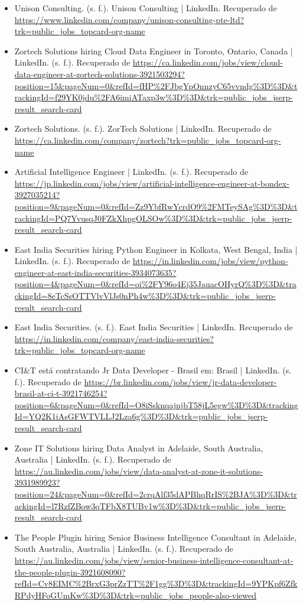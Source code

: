 \documentclass[12pt]{article}
\begin{document}
\begin{itemize}
            \item Unison Consulting. (s. f.). Unison Consulting | LinkedIn. Recuperado de {\url{https://www.linkedin.com/company/unison-consulting-pte-ltd?trk=public_jobs_topcard-org-name}}
            \item Zortech Solutions hiring Cloud Data Engineer in Toronto, Ontario, Canada | LinkedIn. (s. f.). Recuperado de {\url{https://ca.linkedin.com/jobs/view/cloud-data-engineer-at-zortech-solutions-3921503294?position=15&pageNum=0&refId=fHP%2FJbgYpOnnzyC65vvndg%3D%3D&trackingId=f29YK0jdu%2FA6imiATaxp3w%3D%3D&trk=public_jobs_jserp-result_search-card}}
            \item Zortech Solutions. (s. f.). ZorTech Solutions | LinkedIn. Recuperado de {\url{https://ca.linkedin.com/company/zortech?trk=public_jobs_topcard-org-name}}
            \item Artificial Intelligence Engineer | LinkedIn. (s. f.). Recuperado de {\url{https://jp.linkedin.com/jobs/view/artificial-intelligence-engineer-at-bondex-3927035214?position=9&pageNum=0&refId=Zz9YbfRwYcrdO9%2FMTeySAg%3D%3D&trackingId=PQ7YvusqJ0FZkXhpgOLSOw%3D%3D&trk=public_jobs_jserp-result_search-card}}
            \item East India Securities hiring Python Engineer in Kolkata, West Bengal, India | LinkedIn. (s. f.). Recuperado de {\url{https://in.linkedin.com/jobs/view/python-engineer-at-east-india-securities-3934073635?position=4&pageNum=0&refId=oi%2FY96o4Ej35JauacOHyrQ%3D%3D&trackingId=8eTcSsOTTVlvVlJs0nPh4w%3D%3D&trk=public_jobs_jserp-result_search-card}}
            \item East India Securities. (s. f.). East India Securities | LinkedIn. Recuperado de {\url{https://in.linkedin.com/company/east-india-securities?trk=public_jobs_topcard-org-name}}
            \item CI\&T está contratando Jr Data Developer - Brasil em: Brasil | LinkedIn. (s. f.). Recuperado de {\url{https://br.linkedin.com/jobs/view/jr-data-developer-brasil-at-ci-t-3921746254?position=6&pageNum=0&refId=O8iSsknqajnjbT58jL5egw%3D%3D&trackingId=YQ2K1iAsGFWTVLLJ2Lza6g%3D%3D&trk=public_jobs_jserp-result_search-card}}
            \item Zone IT Solutions hiring Data Analyst in Adelaide, South Australia, Australia | LinkedIn. (s. f.). Recuperado de {\url{https://au.linkedin.com/jobs/view/data-analyst-at-zone-it-solutions-3931989923?position=24&pageNum=0&refId=2crqAlf35dAPBhqRrIS%2BJA%3D%3D&trackingId=l7RzfZBow3qTFbX8TUBv1w%3D%3D&trk=public_jobs_jserp-result_search-card}}
            \item The People Plugin hiring Senior Business Intelligence Consultant in Adelaide, South Australia, Australia | LinkedIn. (s. f.). Recuperado de {\url{https://au.linkedin.com/jobs/view/senior-business-intelligence-consultant-at-the-people-plugin-3921608090?refId=Cv8EIMC%2BrxG3prZzTT%2F1gg%3D%3D&trackingId=9YPKpf6ZfkRPdyHFoGUmKw%3D%3D&trk=public_jobs_people-also-viewed}}
               
        \end{itemize}
        
\end{document}

